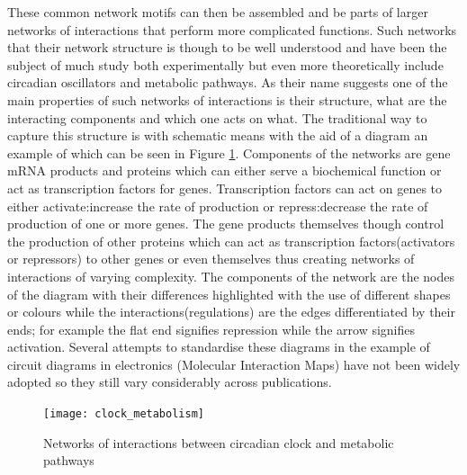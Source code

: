 \documentclass[12pt,a4paper,titlepage]{article}
\begin{document}
These common network motifs can then be assembled and be parts of larger networks of interactions that perform more complicated functions.  Such networks that their network structure is though to be well understood and have been the subject of much study both experimentally but even more theoretically include circadian oscillators and metabolic pathways\cite{bass2010circadian, sahar2012regulation, mirsky2009model}. As their name suggests one of the main properties of such networks of interactions is their structure, what are the interacting components and which one acts on what. The traditional way to capture this structure is with schematic means with the aid of a diagram an example of which can be seen in Figure \ref{fig:diagram_example}. Components of the networks are gene mRNA products and proteins which can either serve a biochemical function or act as transcription factors for genes. Transcription factors can act on genes to either activate:increase the rate of production or repress:decrease the rate of production of one or more genes. The gene products themselves though control the production of other proteins which can act as transcription factors(activators or repressors) to other genes or even themselves thus creating networks of interactions of varying complexity. The components of the network are the nodes of the diagram with their differences highlighted with the use of different shapes or colours while the interactions(regulations) are the edges differentiated by their ends; for example the flat end signifies repression while the arrow signifies activation. Several attempts to standardise these diagrams in the example of circuit diagrams in electronics (Molecular Interaction Maps\cite{kohn2006molecular}) have not been widely adopted so they still vary considerably across publications.
\begin{figure}
\centering
\texttt{[image: clock\_metabolism]}
\caption{Networks of interactions between circadian clock and metabolic pathways\cite{sahar2012regulation}}

\label{fig:diagram_example}
\end{figure}
\end{document}
